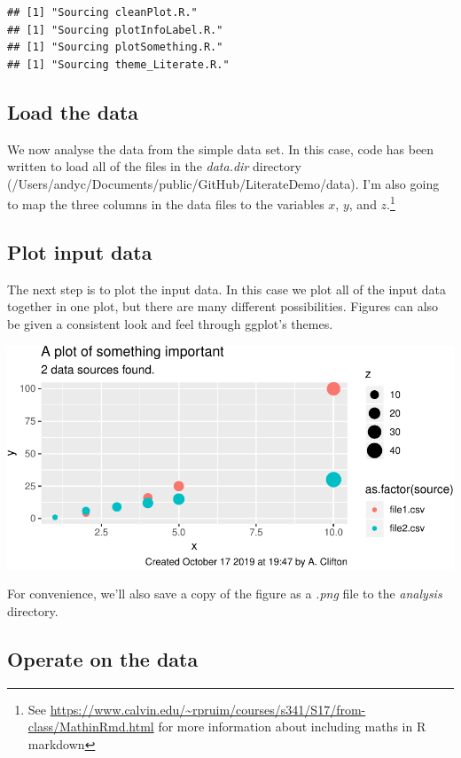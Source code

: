 \documentclass[10pt,]{article}
\let\rmarkdownfootnote\footnote%
\def\footnote{\protect\rmarkdownfootnote}
\begin{document}
\begin{verbatim}
## [1] "Sourcing cleanPlot.R."
## [1] "Sourcing plotInfoLabel.R."
## [1] "Sourcing plotSomething.R."
## [1] "Sourcing theme_Literate.R."
\end{verbatim}

\hypertarget{load-the-data}{%
\subsection{Load the data}\label{load-the-data}}

We now analyse the data from the simple data set. In this case, code has been written to load all of the files in the \emph{data.dir} directory (/Users/andyc/Documents/public/GitHub/LiterateDemo/data). I'm also going to map the three columns in the data files to the variables \(x\), \(y\), and \(z\).\footnote{See \url{https://www.calvin.edu/~rpruim/courses/s341/S17/from-class/MathinRmd.html} for more information about including maths in R markdown}

\hypertarget{plot-input-data}{%
\subsection{Plot input data}\label{plot-input-data}}

The next step is to plot the input data. In this case we plot all of the input data together in one plot, but there are many different possibilities. Figures can also be given a consistent look and feel through ggplot's themes.

\includegraphics{main_files/figure-latex/plot input data-1.pdf}

For convenience, we'll also save a copy of the figure as a \emph{.png} file to the \emph{analysis} directory.

\hypertarget{operate-on-the-data}{%
\subsection{Operate on the data}\label{operate-on-the-data}}
\end{document}
